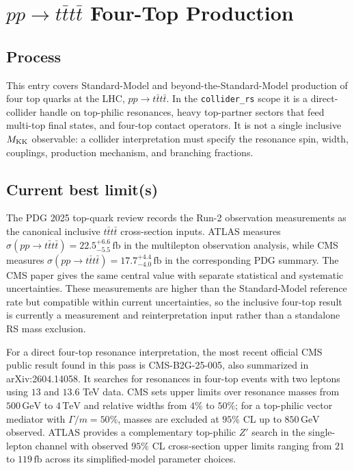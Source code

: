 
\section{\texorpdfstring{\(pp \to t\bar t t\bar t\) Four-Top Production}{pp to t tbar t tbar Four-Top Production}}

\subsection*{Process}
This entry covers Standard-Model and beyond-the-Standard-Model production of
four top quarks at the LHC, \(pp\to t\bar t t\bar t\).  In the
\texttt{collider\_rs} scope it is a direct-collider handle on top-philic
resonances, heavy top-partner sectors that feed multi-top final states, and
four-top contact operators.  It is not a single inclusive \(M_{\rm KK}\)
observable: a collider interpretation must specify the resonance spin, width,
couplings, production mechanism, and branching fractions.

\subsection*{Current best limit(s)}
The PDG 2025 top-quark review records the Run-2 observation measurements as the
canonical inclusive \(t\bar t t\bar t\) cross-section inputs.  ATLAS measures
\(\sigma(pp\to t\bar t t\bar t)=22.5^{+6.6}_{-5.5}\,\mathrm{fb}\) in the
multilepton observation analysis, while CMS measures
\(\sigma(pp\to t\bar t t\bar t)=17.7^{+4.4}_{-4.0}\,\mathrm{fb}\) in the
corresponding PDG summary.  The CMS paper gives the same central value with
separate statistical and systematic uncertainties.  These measurements are
higher than the Standard-Model reference rate but compatible within current
uncertainties, so the inclusive four-top result is currently a
measurement and reinterpretation input rather than a standalone RS mass
exclusion.

For a direct four-top resonance interpretation, the most recent official CMS
public result found in this pass is CMS-B2G-25-005, also summarized in
arXiv:2604.14058.  It searches for resonances in four-top events with two
leptons using \(13\) and \(13.6\) TeV data.  CMS sets upper limits over
resonance masses from \(500\,\mathrm{GeV}\) to \(4\,\mathrm{TeV}\) and relative
widths from \(4\%\) to \(50\%\); for a top-philic vector mediator with
\(\Gamma/m=50\%\), masses are excluded at \(95\%\) CL up to
\(850\,\mathrm{GeV}\) observed.  ATLAS provides a complementary top-philic
\(Z'\) search in the single-lepton channel with observed \(95\%\) CL
cross-section upper limits ranging from \(21\) to \(119\,\mathrm{fb}\) across
its simplified-model parameter choices.

